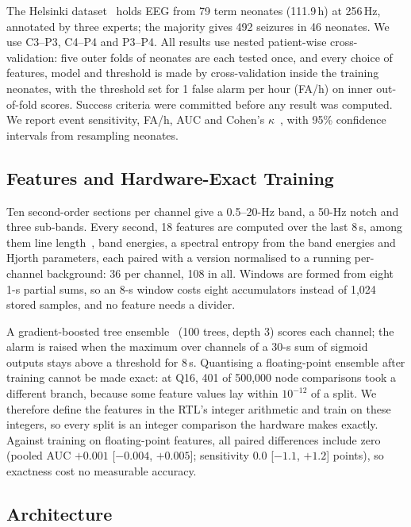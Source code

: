 \documentclass[conference]{IEEEtran}
\begin{document}
The Helsinki dataset~\cite{stevenson2019} holds EEG from 79 term neonates (111.9\,h) at 256\,Hz, annotated by three experts; the majority gives 492 seizures in 46 neonates. We use C3--P3, C4--P4 and P3--P4. All results use nested patient-wise cross-validation: five outer folds of neonates are each tested once, and every choice of features, model and threshold is made by cross-validation inside the training neonates, with the threshold set for 1 false alarm per hour (FA/h) on inner out-of-fold scores. Success criteria were committed before any result was computed. We report event sensitivity, FA/h, AUC and Cohen's $\kappa$~\cite{cohen1960}, with 95\% confidence intervals from resampling neonates.

\subsection{Features and Hardware-Exact Training}

Ten second-order sections per channel give a 0.5--20-Hz band, a 50-Hz notch and three sub-bands. Every second, 18 features are computed over the last 8\,s, among them line length~\cite{esteller2001}, band energies, a spectral entropy from the band energies and Hjorth parameters, each paired with a version normalised to a running per-channel background: 36 per channel, 108 in all. Windows are formed from eight 1-s partial sums, so an 8-s window costs eight accumulators instead of 1,024 stored samples, and no feature needs a divider.

A gradient-boosted tree ensemble~\cite{friedman2001} (100 trees, depth 3) scores each channel; the alarm is raised when the maximum over channels of a 30-s sum of sigmoid outputs stays above a threshold for 8\,s. Quantising a floating-point ensemble after training cannot be made exact: at Q16, 401 of 500,000 node comparisons took a different branch, because some feature values lay within $10^{-12}$ of a split. We therefore define the features in the RTL's integer arithmetic and train on these integers, so every split is an integer comparison the hardware makes exactly. Against training on floating-point features, all paired differences include zero (pooled AUC $+0.001$ [$-0.004$, $+0.005$]; sensitivity $0.0$ [$-1.1$, $+1.2$] points), so exactness cost no measurable accuracy.

\subsection{Architecture}
\end{document}
